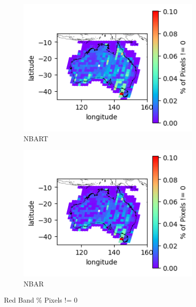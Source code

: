 \documentclass[a4paper]{article}
\begin{document}
      \begin{figure}[h!]
        \centering
          \begin{subfigure}[l]{.4\linewidth}
            \hspace{-32mm}
            \includegraphics[scale=0.9]{plots/nbart/nbart_red-PercentDifferent.png}
            \caption{NBART}
          \end{subfigure}
%
          \begin{subfigure}[r]{.4\linewidth}
            \includegraphics[scale=0.9]{plots/nbar/nbar_red-PercentDifferent.png}
            \caption{NBAR}
          \end{subfigure}
        \caption{Red Band \% Pixels != 0}\label{figure:18}
      \end{figure}

  \clearpage
\end{document}
